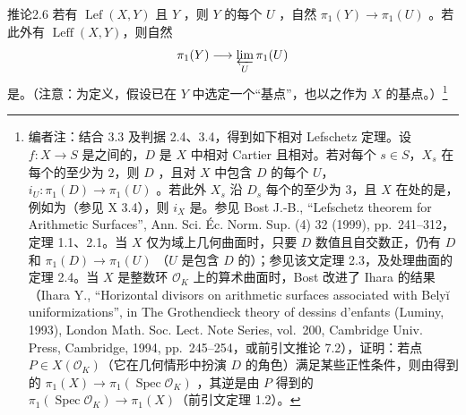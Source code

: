\begin{SGAresult}{推论}{2.6}
若有 $\operatorname{Lef}(X,Y)$ 且 $Y$ ，则 $Y$ 的每个 $U$ ，自然 $\pi_1(Y)\to\pi_1(U)$ 。若此外有 $\operatorname{Leff}(X,Y)$，则自然
\[\pi_1(Y)\longrightarrow\varprojlim_U\pi_1(U)\]
是。（注意：为定义，假设已在 $Y$ 中选定一个“基点”，也以之作为 $X$ 的基点。）\footnote{编者注：结合 3.3 及判据 2.4、3.4，得到如下相对 Lefschetz 定理。设 $f:X\to S$ 是之间的，$D$ 是 $X$ 中相对 Cartier 且相对。若对每个 $s\in S$，$X_s$ 在每个的至少为 $2$，则 $D$ ，且对 $X$ 中包含 $D$ 的每个 $U$， $i_U:\pi_1(D)\to\pi_1(U)$ 。若此外 $X_s$ 沿 $D_s$ 每个的至少为 $3$，且 $X$ 在处的是，例如为（参见 X 3.4），则 $i_X$ 是。参见 Bost J.-B., ``Lefschetz theorem for Arithmetic Surfaces'', Ann. Sci. Éc. Norm. Sup. (4) 32 (1999), pp.~241--312，定理 1.1、2.1。当 $X$ 仅为域上几何曲面时，只要 $D$ 数值且自交数正，仍有 $D$ 和 $\pi_1(D)\to\pi_1(U)$ （$U$ 是包含 $D$ 的）；参见该文定理 2.3，及处理曲面的定理 2.4。当 $X$ 是整数环 $\mathcal O_K$ 上的算术曲面时，Bost 改进了 Ihara 的结果（Ihara Y., ``Horizontal divisors on arithmetic surfaces associated with Belyĭ uniformizations'', in The Grothendieck theory of dessins d'enfants (Luminy, 1993), London Math. Soc. Lect. Note Series, vol.~200, Cambridge Univ. Press, Cambridge, 1994, pp.~245--254，或前引文推论 7.2），证明：若点 $P\in X(\mathcal O_K)$（它在几何情形中扮演 $D$ 的角色）满足某些正性条件，则由得到的 $\pi_1(X)\to\pi_1(\operatorname{Spec}\mathcal O_K)$ ，其逆是由 $P$ 得到的 $\pi_1(\operatorname{Spec}\mathcal O_K)\to\pi_1(X)$（前引文定理 1.2）。}
\end{SGAresult}
